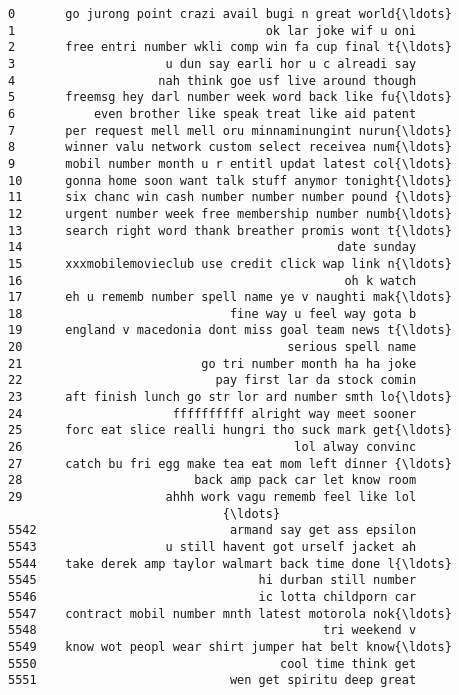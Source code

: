 \documentclass[11pt]{article}
\begin{document}
    \begin{Verbatim}[commandchars=\\\{\}]
0       go jurong point crazi avail bugi n great world{\ldots}
1                                   ok lar joke wif u oni
2       free entri number wkli comp win fa cup final t{\ldots}
3                     u dun say earli hor u c alreadi say
4                    nah think goe usf live around though
5       freemsg hey darl number week word back like fu{\ldots}
6           even brother like speak treat like aid patent
7       per request mell mell oru minnaminungint nurun{\ldots}
8       winner valu network custom select receivea num{\ldots}
9       mobil number month u r entitl updat latest col{\ldots}
10      gonna home soon want talk stuff anymor tonight{\ldots}
11      six chanc win cash number number number pound {\ldots}
12      urgent number week free membership number numb{\ldots}
13      search right word thank breather promis wont t{\ldots}
14                                            date sunday
15      xxxmobilemovieclub use credit click wap link n{\ldots}
16                                             oh k watch
17      eh u rememb number spell name ye v naughti mak{\ldots}
18                             fine way u feel way gota b
19      england v macedonia dont miss goal team news t{\ldots}
20                                     serious spell name
21                         go tri number month ha ha joke
22                           pay first lar da stock comin
23      aft finish lunch go str lor ard number smth lo{\ldots}
24                     ffffffffff alright way meet sooner
25      forc eat slice realli hungri tho suck mark get{\ldots}
26                                      lol alway convinc
27      catch bu fri egg make tea eat mom left dinner {\ldots}
28                        back amp pack car let know room
29                    ahhh work vagu rememb feel like lol
                              {\ldots}                        
5542                           armand say get ass epsilon
5543                  u still havent got urself jacket ah
5544    take derek amp taylor walmart back time done l{\ldots}
5545                               hi durban still number
5546                               ic lotta childporn car
5547    contract mobil number mnth latest motorola nok{\ldots}
5548                                        tri weekend v
5549    know wot peopl wear shirt jumper hat belt know{\ldots}
5550                                  cool time think get
5551                           wen get spiritu deep great

\end{Verbatim}
\end{document}
